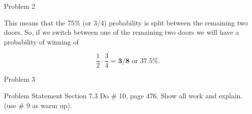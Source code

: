 \begin{problem}{Problem 2}
\begin{highlight}[Solution]
        This means that the 75\% (or 3/4) probability is split between the remaining two doors. So, if we switch between one of the remaining two doors we will have a probability of winning of

        \begin{equation}
            \frac{1}{2} \cdot \frac{3}{4} = \mathbf{3/8} \text{ or } \mathbf{37.5 \%}.
        \end{equation}
    \end{highlight}
\end{problem}

\begin{problem}{Problem 3}
    \begin{statement}{Problem Statement}
        Section 7.3 Do \# 10, page 476. Show all work and explain. (use \# 9 as warm up).
    \end{statement}
\end{problem}

